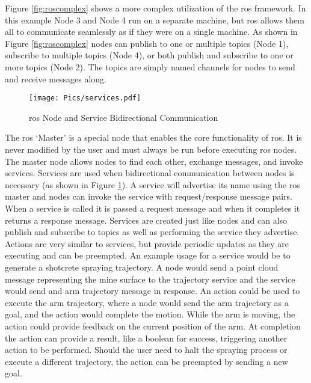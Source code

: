 Figure \ref{fig:roscomplex} shows a more complex utilization of the \acrshort{ros} framework. In this example Node 3 and Node 4 run on a separate machine, but \acrshort{ros} allows them all to communicate seamlessly as if they were on a single machine. As shown in Figure \ref{fig:roscomplex} nodes can publish to one or multiple topics (Node 1), subscribe to multiple topics (Node 4), or both publish and subscribe to one or more topics (Node 2). The topics are simply named channels for nodes to send and receive messages along.\\

\begin{figure}[h!]
    \centering
    \texttt{[image: Pics/services.pdf]}
    \caption{\acrshort{ros} Node and Service Bidirectional Communication}
    \label{fig:rosservicelong}
\end{figure}

The \acrshort{ros} `Master' is a special node that enables the core functionality of \acrshort{ros}. It is never modified by the user and must always be run before executing \acrshort{ros} nodes. The master node allows nodes to find each other, exchange messages, and invoke services. Services are used when bidirectional communication between nodes is necessary (as shown in Figure \ref{fig:rosservicelong}). A service will advertise its name using the \acrshort{ros} master and nodes can invoke the service with request/response message pairs. When a service is called it is passed a request message and when it completes it returns a response message. Services are created just like nodes and can also publish and subscribe to topics as well as performing the service they advertise. Actions are very similar to services, but provide periodic updates as they are executing and can be preempted. An example usage for a service would be to generate a shotcrete spraying trajectory. A node would send a point cloud message representing the mine surface to the trajectory service and the service would send and arm trajectory message in response. An action could be used to execute the arm trajectory, where a node would send the arm trajectory as a goal, and the action would complete the motion. While the arm is moving, the action could provide feedback on the current position of the arm. At completion the action can provide a result, like a boolean for success, triggering another action to be performed. Should the user need to halt the spraying process or execute a different trajectory, the action can be preempted by sending a new goal.\\

